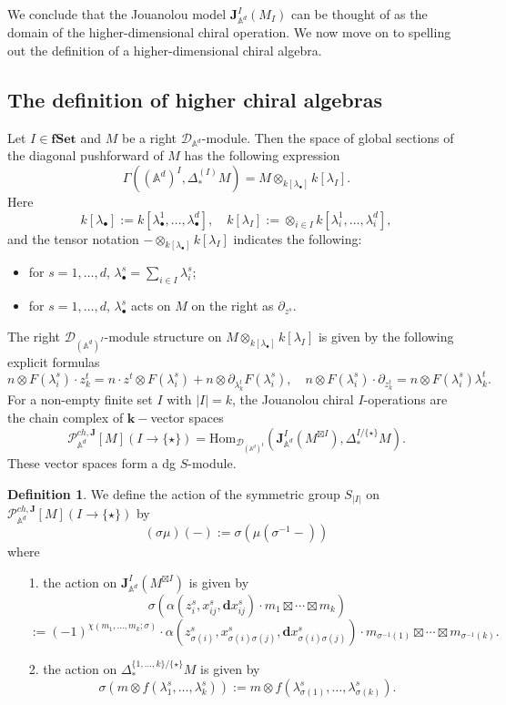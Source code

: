 \documentclass[11pt]{amsart}
\theoremstyle{definition}
\newtheorem{defn}[thm]{Definition}
\theoremstyle{remark}
\numberwithin{equation}{section}
\begin{document}
    We conclude that the Jouanolou model $\mathbf{J}_{\mathbb{A}^d}^{{I}}(M_{{I}})$ can be thought of as the domain of the higher-dimensional chiral operation.
    We now move on to spelling out the definition of a higher-dimensional chiral algebra.

    \subsection{The definition of higher chiral algebras}

Let ${I}\in {\mathbf{fSet}}$ and $M$ be a right $\mathcal{D}_{\mathbb{A}^d}$-module. Then the space of global sections of the diagonal pushforward of $M$ has the following expression
$$
\Gamma\left((\mathbb{A}^d)^{{I}},\Delta_*^{({I})}M\right)=M\otimes_{k[\lambda_{\bullet}]}k[\lambda_I].
$$
Here
$$
k[\lambda_{\bullet}]:=k[\lambda^1_{\bullet},\dots,\lambda^d_{\bullet}], \quad k[\lambda_{I}]:=\otimes_{{i\in I}}k[\lambda^1_{i},\dots,\lambda^d_{i}],
$$
and the tensor notation $-\otimes_{k[\lambda_{\bullet}]}k[\lambda_I]$ indicates the following:
\begin{itemize}
  \item for $s=1,\dots,d$, $\lambda^s_{\bullet}=\sum\limits_{i\in I}\lambda^s_i$;
  \item for $s=1,\dots,d$, $\lambda^s_{\bullet}$ acts on $M$ on the right as $\partial_{z^s}$.
\end{itemize}
The right $\mathcal{D}_{(\mathbb{A}^d)^{{I}}}$-module structure on $M\otimes_{k[\lambda_{\bullet}]}k[\lambda_I]$ is given by the following explicit formulas
$$
n\otimes F(\lambda^s_i)\cdot z^t_k=n \cdot z^t\otimes F(\lambda^s_i)+n\otimes \partial_{\lambda^t_k}F(\lambda^s_i),\quad n\otimes F(\lambda^s_i)\cdot \partial_{z^t_k}=n\otimes F(\lambda^s_i)\lambda^t_k.
$$
For a non-empty finite set $I$ with $|I|=k$, the Jouanolou chiral $I$-operations are the chain complex of $\mathbf{k}-$vector spaces
$$
\mathcal{P}^{ch,\mathbf{J}}_{\mathbb{A}^d}[M](I\rightarrow \{\star\})=\mathrm{Hom}_{\mathcal{D}_{(\mathbb{A}^d)^{I}}}\left(\mathbf{J}_{\mathbb{A}^d}^{I}(M^{\boxtimes I}),\Delta^{I/\{\star\}}_*M\right).
$$
These vector spaces form a dg $S$-module.
\begin{defn}
    We define the action of the symmetric group $S_{|I|}$ on $\mathcal{P}^{ch,\mathbf{J}}_{\mathbb{A}^d}[M](I\rightarrow \{\star\})$ by
$$
(\sigma\mu)(-):=\sigma\left(\mu(\sigma^{-1}-)\right)
$$
where
\begin{itemize}
  \item[1.] the action on $\mathbf{J}_{\mathbb{A}^d}^{I}(M^{\boxtimes I})$ is given by 
    $$
    \sigma\left(\alpha(z^s_i,x^s_{ij},\mathbf{d}x^s_{ij})\cdot m_1\boxtimes\cdots\boxtimes m_k\right)
    $$
    $$
    :=(-1)^{\chi(m_1,\dots,m_k;\sigma)}\cdot\alpha(z^s_{\sigma(i)},x^s_{\sigma(i)\sigma(j)},\mathbf{d}x^s_{\sigma(i)\sigma(j)})\cdot m_{\sigma^{-1}(1)}\boxtimes\cdots\boxtimes m_{\sigma^{-1}(k)}.
    $$
  \item[2.] the action on $\Delta_*^{\{1,\dots,k\}/\{\star\}}M$ is given by 
    $$
    \sigma\left(m\otimes f(\lambda^s_1,\dots,\lambda^s_k)\right):=m\otimes f(\lambda^s_{\sigma(1)},\dots,\lambda^s_{\sigma(k)}).
    $$
\end{itemize}
\end{defn}
\end{document}
